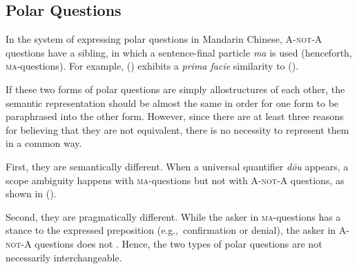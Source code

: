 \documentclass[11pt]{article}
\def\anota{\textsc{A-not-A}}
\newcommand{\myref}[1]{(\getref{#1})}
\begin{document}
\subsection{Polar Questions}
\label{ssec:polar}

In the system of expressing polar questions in Mandarin Chinese,
{\anota} questions have a sibling, in which a sentence-final particle
\textit{ma} is used (henceforth, \textsc{ma}-questions).  For example,
\myref{exe:yesno} exhibits a \textit{prima facie} similarity to
().

{\small 
{}}
\vspace{-20pt}


\noindent If these two forms of polar questions are simply
allostructures of each other, the semantic representation should be
almost the same in order for one form to be paraphrased into the other
form. However, since there are at least three reasons for believing
that they are not equivalent, there is no necessity to represent them
in a common way. 


First, they are semantically different.  When a universal quantifier
 \textit{d\={o}u} appears, a scope ambiguity happens
with \textsc{ma}-questions but not with {\anota} questions, as shown in
\myref{exe:scope}.


{\small 
{}}
\vspace{-20pt}



Second, they are pragmatically different. While the asker in
\textsc{ma}-questions has a stance to the expressed preposition (e.g.,\
confirmation or denial), the asker in {\anota} questions does not
\cite{liing:14}. Hence, the two types of polar questions are not
necessarily interchangeable. 
\end{document}
